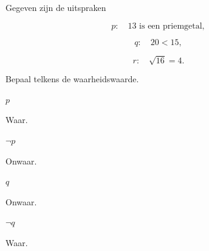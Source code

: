 \documentclass{ximera}
\begin{document}
\begin{oefening}{\oefB \ESS}

Gegeven zijn de uitspraken

\[
p:\quad 13\text{ is een priemgetal},
\]

\[
q:\quad 20<15,
\]

\[
r:\quad \sqrt{16}=4.
\]

Bepaal telkens de waarheidswaarde.

\begin{question}

$p$

\begin{oplossing}

Waar.

\end{oplossing}

\end{question}



\begin{question}

$\neg p$

\begin{oplossing}

Onwaar.

\end{oplossing}

\end{question}



\begin{question}

$q$

\begin{oplossing}

Onwaar.

\end{oplossing}

\end{question}



\begin{question}

$\neg q$

\begin{oplossing}

Waar.

\end{oplossing}

\end{question}




\end{oefening}
\end{document}

